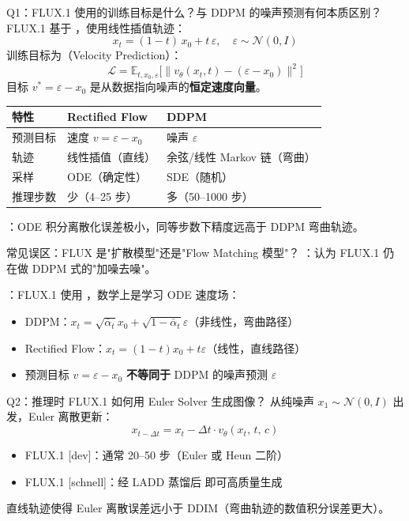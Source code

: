 \begin{conceptbox}{Q1：FLUX.1 使用的训练目标是什么？与 DDPM 的噪声预测有何本质区别？}
FLUX.1 基于 ，使用线性插值轨迹：
\[
x_t = (1-t)\,x_0 + t\,\varepsilon, \quad \varepsilon \sim \mathcal{N}(0,I)
\]
训练目标为（Velocity Prediction）：
\[
\mathcal{L} = \mathbb{E}_{t,x_0,\varepsilon}\bigl[\|v_\theta(x_t, t) - (\varepsilon - x_0)\|^2\bigr]
\]
目标 $v^* = \varepsilon - x_0$ 是从数据指向噪声的\textbf{恒定速度向量}。

\begin{center}
\small
\begin{tabular}{|l|l|l|}
\hline
\textbf{特性} & \textbf{Rectified Flow} & \textbf{DDPM} \\
\hline
预测目标 & 速度 $v = \varepsilon - x_0$ & 噪声 $\varepsilon$ \\
轨迹 & 线性插值（直线） & 余弦/线性 Markov 链（弯曲）\\
采样 & ODE（确定性） & SDE（随机）\\
推理步数 & 少（4--25 步） & 多（50--1000 步）\\
\hline
\end{tabular}
\end{center}

：ODE 积分离散化误差极小，同等步数下精度远高于 DDPM 弯曲轨迹。
\end{conceptbox}

\begin{warnbox}{常见误区：FLUX 是"扩散模型"还是"Flow Matching 模型"？}
：认为 FLUX.1 仍在做 DDPM 式的"加噪去噪"。

：FLUX.1 使用 ，数学上是学习 ODE 速度场：
\begin{itemize}
  \item DDPM：$x_t = \sqrt{\bar\alpha_t}x_0 + \sqrt{1-\bar\alpha_t}\varepsilon$（非线性，弯曲路径）
  \item Rectified Flow：$x_t = (1-t)x_0 + t\varepsilon$（线性，直线路径）
  \item 预测目标 $v = \varepsilon - x_0$ \textbf{不等同于} DDPM 的噪声预测 $\varepsilon$
\end{itemize}
\end{warnbox}

\begin{conceptbox}{Q2：推理时 FLUX.1 如何用 Euler Solver 生成图像？}
从纯噪声 $x_1 \sim \mathcal{N}(0,I)$ 出发，Euler 离散更新：
\[
x_{t-\Delta t} = x_t - \Delta t \cdot v_\theta(x_t,\, t,\, c)
\]
\begin{itemize}
  \item FLUX.1 [dev]：通常 20--50 步（Euler 或 Heun 二阶）
  \item FLUX.1 [schnell]：经 LADD 蒸馏后 即可高质量生成
\end{itemize}
直线轨迹使得 Euler 离散误差远小于 DDIM（弯曲轨迹的数值积分误差更大）。
\end{conceptbox}

